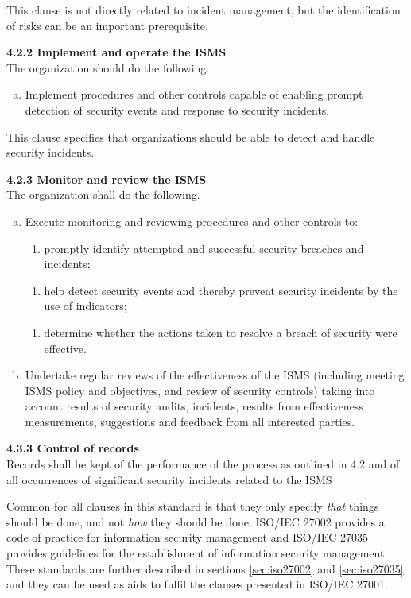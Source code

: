This clause is not directly related to incident management, but the identification of risks can be an important prerequisite. %

\textbf{4.2.2 Implement and operate the \ac{ISMS}} \\
The organization should do the following.
\begin{enumerate}[h)]
\item Implement procedures and other controls capable of enabling prompt detection of security events and response to security incidents.
\end{enumerate}

This clause specifies that organizations should be able to detect and handle security incidents.

\textbf{4.2.3 Monitor and review the ISMS}\\
The organization shall do the following.
\begin{enumerate}[a)]
\item Execute monitoring and reviewing procedures and other controls to:
\begin{enumerate}[2)]
\item promptly identify attempted and successful security breaches and incidents;
\end{enumerate}
\vspace{-0.2cm}
\begin{enumerate}[4)]
\item help detect security events and thereby prevent security incidents by the use of indicators;
\end{enumerate}
\vspace{-0.2cm}
\begin{enumerate}[5)]
\item determine whether the actions taken to resolve a breach of security were effective.
\end{enumerate}
\item Undertake regular reviews of the effectiveness of the \ac{ISMS} (including meeting \ac{ISMS} policy and objectives, and review of security controls) taking into account results of security audits, incidents, results from effectiveness measurements, suggestions and feedback from all interested parties.
\end{enumerate}

\textbf{4.3.3 Control of records}\\
Records shall be kept of the performance of the process as outlined in 4.2 and of all occurrences of significant security incidents related to the \ac{ISMS}

Common for all clauses in this standard is that they only specify \textit{that} things should be done, and not \textit{how} they should be done. \acs{ISO}/\acs{IEC} 27002 provides a code of practice for information security management and \acs{ISO}/\acs{IEC} 27035 provides guidelines for the establishment of information security management. These standards are further described in sections \ref{sec:iso27002} and \ref{sec:iso27035} and they can be used as aids to fulfil the clauses presented in \acs{ISO}/\acs{IEC} 27001.
